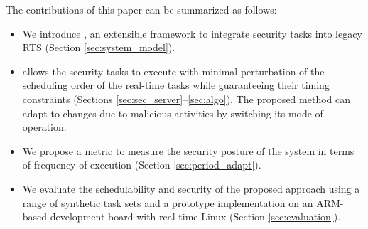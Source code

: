 \documentclass[../rt_server_main.tex]{subfiles}
\begin{document}


The contributions of this paper can be summarized as follows:

\begin{itemize}
\item We introduce \coolname, an extensible framework to integrate security tasks into legacy RTS (Section \ref{sec:system_model}). 

\item \coolname allows the security tasks to execute with minimal perturbation of the scheduling order of the real-time tasks while guaranteeing their timing constraints (Sections \ref{sec:sec_server}--\ref{sec:algo}). The proposed method can adapt to changes due to malicious activities by switching its mode of operation. %


\item We propose a metric to measure the security posture of the system in terms of frequency of execution (Section \ref{sec:period_adapt}).

\item We evaluate the schedulability and security of the proposed approach using a range of synthetic task sets and a prototype implementation on an ARM-based development board with real-time Linux (Section \ref{sec:evaluation}).



\end{itemize}

 
\end{document}
